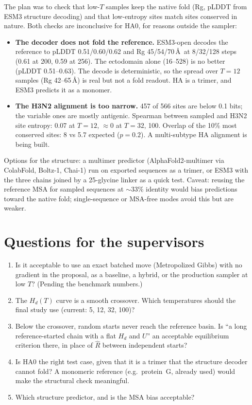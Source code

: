 \documentclass[11pt,a4paper]{article}
\newcommand{\Hd}{H_d}
\begin{document}
The plan was to check that low-$T$ samples keep the native fold
(Rg, pLDDT from ESM3 structure decoding) and that low-entropy sites match
sites conserved in nature. Both checks are inconclusive for HA0, for reasons
outside the sampler:
\begin{itemize}
\item \textbf{The decoder does not fold the reference.} ESM3-open decodes the
  reference to pLDDT 0.51/0.60/0.62 and Rg 45/54/70\,\AA\ at 8/32/128 steps
  (0.61 at 200, 0.59 at 256). The ectodomain alone (16--528) is no better
  (pLDDT 0.51--0.63). The decode is deterministic, so the spread over $T=12$
  samples (Rg 42--65\,\AA) is real but not a fold readout. HA is a trimer, and
  ESM3 predicts it as a monomer.
\item \textbf{The H3N2 alignment is too narrow.} 457 of 566 sites are below
  0.1 bits; the variable ones are mostly antigenic. Spearman between sampled
  and H3N2 site entropy: 0.07 at $T=12$, $\approx0$ at $T=32$, 100. Overlap of
  the 10\% most conserved sites: 8 vs 5.7 expected ($p=0.2$). A multi-subtype
  HA alignment is being built.
\end{itemize}
Options for the structure: a multimer predictor (AlphaFold2-multimer via
ColabFold, Boltz-1, Chai-1) run on exported sequences as a trimer, or ESM3 with
the three chains joined by a 25-glycine linker as a quick test. Caveat: reusing
the reference MSA for sampled sequences at $\sim$33\% identity would bias
predictions toward the native fold; single-sequence or MSA-free modes avoid
this but are weaker.

\section{Questions for the supervisors}

\begin{enumerate}
\item Is it acceptable to use an exact batched move (Metropolized Gibbs) with
  no gradient in the proposal, as a baseline, a hybrid, or the production
  sampler at low $T$? (Pending the benchmark numbers.)
\item The $\Hd(T)$ curve is a smooth crossover. Which temperatures should the
  final study use (current: 5, 12, 32, 100)?
\item Below the crossover, random starts never reach the reference basin. Is
  ``a long reference-started chain with a flat $\Hd$ and $U$'' an acceptable
  equilibrium criterion there, in place of $\hat R$ between independent
  starts?
\item Is HA0 the right test case, given that it is a trimer that the
  structure decoder cannot fold? A monomeric reference (e.g.\ protein~G,
  already used) would make the structural check meaningful.
\item Which structure predictor, and is the MSA bias acceptable?
\end{enumerate}
\end{document}
